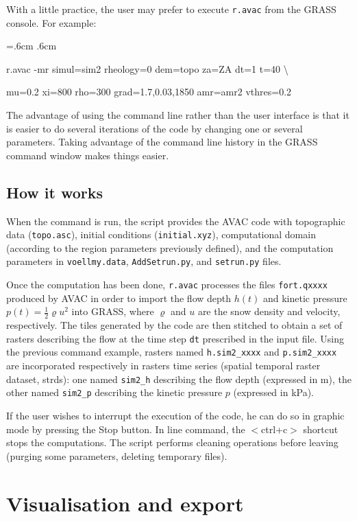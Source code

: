 \documentclass[12pt,oneside]{paper}
\newenvironment{code}{%
\vspace{2mm}%
\hangindent=.6cm%
\parindent.6cm%
\ttfamily%
\color{gris.3}%
}{
\vspace{2mm}%
}
\begin{document}
With a little practice, the user may prefer to execute \verb+r.avac+ from the GRASS console. For example:

\french
\begin{code}
r.avac -mr simul=sim2 rheology=0 dem=topo za=ZA dt=1 t=40 \backslash

mu=0.2 xi=800 rho=300 grad=1.7,0.03,1850 amr=amr2 vthres=0.2
\end{code}
\english

The advantage of using the command line rather than the user interface is that it is easier to do several iterations of the code by changing one or several parameters. Taking advantage of the command line history in the GRASS command window makes things easier.

\subsection{How it works}

When the command is run, the script provides the AVAC code with topographic data (\verb+topo.asc+), initial conditions (\verb+initial.xyz+), computational domain (according to the region parameters previously defined), and the computation parameters in \verb+voellmy.data+, \verb+AddSetrun.py+, and \verb+setrun.py+ files.

Once the computation has been done, \verb+r.avac+ processes the files \texttt{fort.qxxxx} produced by AVAC in order to import the flow depth $h(t)$ and kinetic pressure $p(t)=\frac{1}{2}\varrho u^2$ into GRASS, where $\varrho$ and $u$ are the snow density and velocity, respectively. The tiles generated by the code are then stitched to obtain a set of rasters describing the flow at the time step \texttt{dt} prescribed in the input file. Using the previous command example, rasters named \texttt{h.sim2\_xxxx} and \texttt{p.sim2\_xxxx} are incorporated respectively in rasters time series (spatial temporal raster dataset, strds): one named \texttt{sim2\_h} describing the flow depth (expressed in m), the other named \texttt{sim2\_p} describing the kinetic pressure $p$ (expressed in kPa).

If the user wishes to interrupt the execution of the code, he can do so in graphic mode by pressing the Stop button. In line command,  the $<$ctrl+c$>$ shortcut stops the computations. The script performs cleaning operations before leaving (purging some parameters, deleting temporary files).

\section{Visualisation and export}
\end{document}
